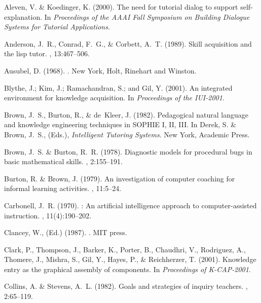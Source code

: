 \documentclass{llncs}
\begin{document}
\begin{thebibliography}{}
\vspace*{-1.0em}
Aleven, V. \& Koedinger, K. (2000).
\newblock The need for tutorial dialog to support self-explanation.
\newblock In {\em Proceedings of the AAAI Fall Symposium on Building Dialogue
  Systems for Tutorial Applications}.

Anderson, J.~R., Conrad, F.~G., \& Corbett, A.~T. (1989).
\newblock Skill acquisition and the lisp tutor.
, 13:467--506.

Ausubel, D. (1968).
.
\newblock New York, Holt, Rinehart and Winston.

Blythe, J.; Kim, J.; Ramachandran, S.; and Gil, Y. (2001).
\newblock An integrated environment for knowledge acquisition.
\newblock In {\em Proceedings of the IUI-2001}.

Brown, J.~S., Burton, R., \& de~Kleer, J. (1982).
\newblock Pedagogical natural language and knowledge engineering techniques in
  SOPHIE I, II, III.
\newblock In Derek, S. \& Brown, J.~S., {\rm (Eds.)}, {\em Intelligent Tutoring
  Systems}. New York, Academic Press.

Brown, J.~S. \& Burton, R.~R. (1978).
\newblock Diagnostic models for procedural bugs in basic mathematical skills.
, 2:155--191.

Burton, R. \& Brown, J. (1979).
\newblock An investigation of computer coaching for informal learning
  activities.
, 11:5--24.

Carbonell, J.~R. (1970).
: An artificial intelligence approach to computer-assisted
  instruction.
, 11(4):190--202.

Clancey, W., {\rm (Ed.)} (1987).
.
\newblock MIT press.

Clark, P., Thompson, J., Barker, K., Porter, B., Chaudhri, V., Rodriguez,
  A., Thomere, J., Mishra, S., Gil, Y., Hayes, P., \& Reichherzer, T. (2001).
\newblock Knowledge entry as the graphical assembly of components.
\newblock In {\em Proceedings of K-CAP-2001}.

Collins, A. \& Stevens, A.~L. (1982).
\newblock Goals and strategies of inquiry teachers.
, 2:65--119.


\end{thebibliography}
\end{document}
